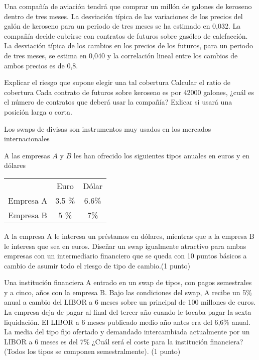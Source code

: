 \begin{problem}[4]
Una compañía de aviación tendrá que comprar un millón de galones de keroseno dentro de tres
meses. La desviación típica de las variaciones de los precios del galón de keroseno para un periodo
de tres meses se ha estimado en 0,032. La compañía decide cubrirse con contratos de futuros sobre
gasóleo de calefacción. La desviación típica de los cambios en los precios de los futuros, para un
periodo de tres meses, se estima en 0,040 y la correlación lineal entre los cambios de ambos precios
es de 0,8.

\ppart Explicar el riesgo que supone elegir una tal cobertura
\ppart Calcular el ratio de cobertura
\ppart Cada contrato de futuros sobre keroseno es por 42000 galones, ¿cuál es el número de contratos que deberá usar la compañía? Exlicar si usará una posición larga o corta.
\solution

\end{problem}

\begin{problem}[5]
Los swaps de divisas son instrumentos muy usados en los mercados internacionales

\ppart A las empresas $A$ y $B$ les han ofrecido los siguientes tipos anuales en euros y en dólares

\begin{center}
\begin{tabular}{ccc}
\hline
& Euro & Dólar \\
Empresa A & 3.5 \% & 6.6\% \\
Empresa B & 5 \% & 7\% \\
\hline
\end{tabular}
\end{center}

A la empresa A le interesa un préstamos en dólares, mientras que a la empresa B le interesa que
sea en euros. Diseñar un swap igualmente atractivo para ambas empresas con un intermediario
financiero que se queda con 10 puntos básicos a cambio de asumir todo el riesgo de tipo de
cambio.(1 punto)

\ppart Una institución financiera A entrado en un swap de tipos, con pagos semestrales y a cinco,
años con la empresa B. Bajo las condiciones del swap, A recibe un 5\% anual a cambio del
LIBOR a 6 meses sobre un principal de 100 millones de euros. La empresa deja de pagar
al final del tercer año cuando le tocaba pagar la sexta liquidación. El LIBOR a 6 meses
publicado medio año antes era del 6,6\% anual. La media del tipo fijo ofertado y demandado
intercambiada actualmente por un LIBOR a 6 meses es del 7\% ¿Cuál será el coste para la
institución financiera? (Todos los tipos se componen semestralmente). (1 punto)

\solution

\end{problem}